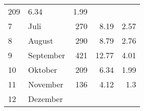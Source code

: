 \begin{longtable}{lXrrr}
       \num{209} &
       \num[round-mode=places,round-precision=2]{6,34} &
         \num[round-mode=places,round-precision=2]{1,99} \\

     7 &
     \multicolumn{1}{X}{ Juli   } &


       \num{270} &
       \num[round-mode=places,round-precision=2]{8,19} &
         \num[round-mode=places,round-precision=2]{2,57} \\

     8 &
     \multicolumn{1}{X}{ August   } &


       \num{290} &
       \num[round-mode=places,round-precision=2]{8,79} &
         \num[round-mode=places,round-precision=2]{2,76} \\

     9 &
     \multicolumn{1}{X}{ September   } &


       \num{421} &
       \num[round-mode=places,round-precision=2]{12,77} &
         \num[round-mode=places,round-precision=2]{4,01} \\

     10 &
     \multicolumn{1}{X}{ Oktober   } &


       \num{209} &
       \num[round-mode=places,round-precision=2]{6,34} &
         \num[round-mode=places,round-precision=2]{1,99} \\

     11 &
     \multicolumn{1}{X}{ November   } &


       \num{136} &
       \num[round-mode=places,round-precision=2]{4,12} &
         \num[round-mode=places,round-precision=2]{1,3} \\

     12 &
     \multicolumn{1}{X}{ Dezember   } &



\end{longtable}
